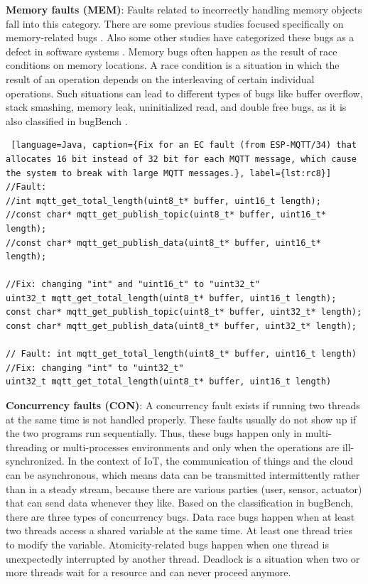  
\textbf{Memory faults (MEM)}: Faults related to incorrectly handling memory objects fall into this category. There are some previous studies focused specifically on memory-related bugs \cite{memBugs}. Also some other studies have categorized these bugs as a defect in software systems \cite{openSourceBugs}. Memory bugs often happen as the result of race conditions on memory locations. A race condition is a situation in which the result of an operation depends on the interleaving of certain individual operations. Such situations can lead to different types of bugs like buffer overflow, stack smashing, memory leak, uninitialized read, and double free bugs, as it is also classified in bugBench \cite{bugBench}.

\begin{lstlisting} [language=Java, caption={Fix for an EC fault (from ESP-MQTT/34) that allocates 16 bit instead of 32 bit for each MQTT message, which cause the system to break with large MQTT messages.}, label={lst:rc8}] 
//Fault: 
//int mqtt_get_total_length(uint8_t* buffer, uint16_t length);
//const char* mqtt_get_publish_topic(uint8_t* buffer, uint16_t* length);
//const char* mqtt_get_publish_data(uint8_t* buffer, uint16_t* length);

//Fix: changing "int" and "uint16_t" to "uint32_t"
uint32_t mqtt_get_total_length(uint8_t* buffer, uint16_t length);
const char* mqtt_get_publish_topic(uint8_t* buffer, uint32_t* length);
const char* mqtt_get_publish_data(uint8_t* buffer, uint32_t* length);

// Fault: int mqtt_get_total_length(uint8_t* buffer, uint16_t length)
//Fix: changing "int" to "uint32_t"
uint32_t mqtt_get_total_length(uint8_t* buffer, uint16_t length)
\end{lstlisting}


\textbf{Concurrency faults (CON)}: A concurrency fault exists if running two threads at the same time is not handled properly. These faults usually do not show up if the two programs run sequentially. Thus, these bugs happen only in multi-threading or multi-processes environments and only when the operations are ill-synchronized. In the context of IoT, the communication of things and the cloud can be asynchronous, which means data can be transmitted intermittently rather than in a steady stream, because there are various parties (user, sensor, actuator) that can send data whenever they like. Based on the classification in bugBench, there are three types of concurrency bugs. Data race bugs happen when at least two threads access a shared variable at the same time. At least one thread tries to modify the variable. Atomicity-related bugs happen when one thread is unexpectedly interrupted by another thread. Deadlock is a situation when two or more threads wait for a resource and can never proceed anymore. 


